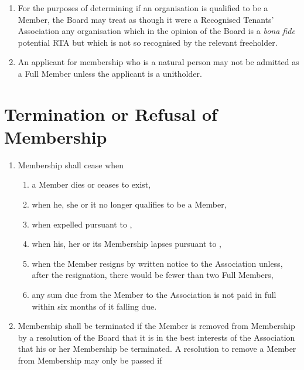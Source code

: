 \documentclass[10pt]{mk-articles-of-association}
\newcommand{\mysection}[1]{
  \end{enumerate}
  \section*{#1}
  \begin{enumerate}[resume]
}
\newcommand{\EC}[0]{Board}
\newcommand{\Exec}[0]{\EC{} }
\newcommand{\RTA}[0]{Recognised Tenants' Association}
\begin{document}
\begin{enumerate}
\begin{enumerate}
    \item support the Objects of the Association, free of any conflict
      of interest, \ITand

    \item have the legal form of a natural person, an unincorporated
      association or a UK-registered company limited by guarantee.

    \end{enumerate}

  \item For the purposes of determining if an organisation is
    qualified to be a Member, the \Exec may treat as though it were a
    \RTA{} any organisation which in the opinion of the \Exec is a
    \textit{bona fide} potential RTA but which is not so recognised by
    the relevant freeholder.

  \item An applicant for membership who is a natural person may not be
    admitted as a Full Member unless the applicant is a unitholder.

\mysection{Termination or Refusal of Membership}

  \item
    Membership shall cease when
    \begin{enumerate}
      \item a Member dies or ceases to exist,
      \item when he, she or it no longer qualifies to be a Member,
      \item when expelled pursuant to ,
      \item when his, her or its Membership lapses pursuant to
        ,
      \item when the Member resigns by written notice to the
        Association unless, after the resignation, there would be
        fewer than two Full Members, \ITor{}
      \item any sum due from the Member to the Association is not paid in full
        within six months of it falling due.
    \end{enumerate}

\item Membership shall be terminated if
\label{expulsion}
  the Member is removed from Membership by a resolution of the
  \Exec that it is in the best interests of the Association that his or
  her Membership be terminated. A resolution to remove a Member from
  Membership may only be passed if


\end{enumerate}
\end{document}
